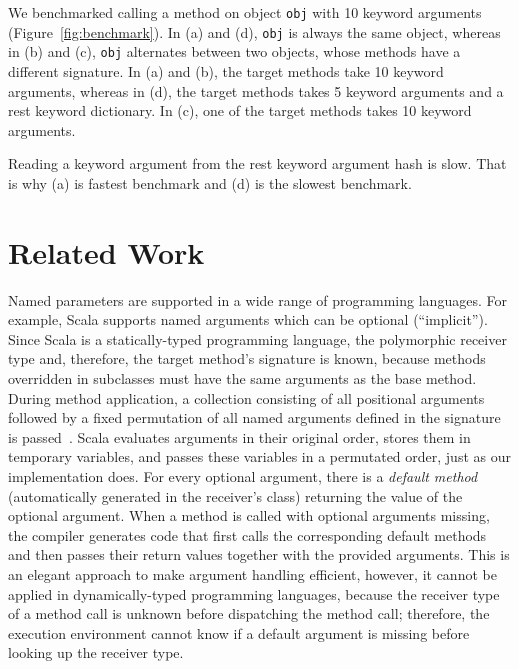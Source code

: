 \documentclass{sigplanconf} %
\begin{document}
We benchmarked calling a method on object \lstinline{obj} with 10 keyword arguments (Figure~\ref{fig:benchmark}). In (a) and (d), \lstinline{obj} is always the same object, whereas in (b) and (c), \lstinline{obj} alternates between two objects, whose methods have a different signature. In (a) and (b), the target methods take 10 keyword arguments, whereas in (d), the target methods takes 5 keyword arguments and a rest keyword dictionary. In (c), one of the target methods takes 10 keyword arguments.

Reading a keyword argument from the rest keyword argument hash is slow. That is why (a) is fastest benchmark and (d) is the slowest benchmark.

\section{Related Work}
\label{sec:related}
Named parameters are supported in a wide range of programming languages. For example, Scala supports named arguments which can be optional (``implicit''). Since Scala is a statically-typed programming language, the polymorphic receiver type and, therefore, the target method's signature is known, because methods overridden in subclasses must have the same arguments as the base method. During method application, a collection consisting of all positional arguments followed by a fixed permutation of all named arguments defined in the signature is passed~\cite{Rytz:2010:NDA:1774088.1774529}. Scala evaluates arguments in their original order, stores them in temporary variables, and passes these variables in a permutated order, just as our implementation does. For every optional argument, there is a \emph{default method} (automatically generated in the receiver's class) returning the value of the optional argument. When a method is called with optional arguments missing, the compiler generates code that first calls the corresponding default methods and then passes their return values together with the provided arguments. This is an elegant approach to make argument handling efficient, however, it cannot be applied in dynamically-typed programming languages, because the receiver type of a method call is unknown before dispatching the method call; therefore, the execution environment cannot know if a default argument is missing before looking up the receiver type.
\end{document}
